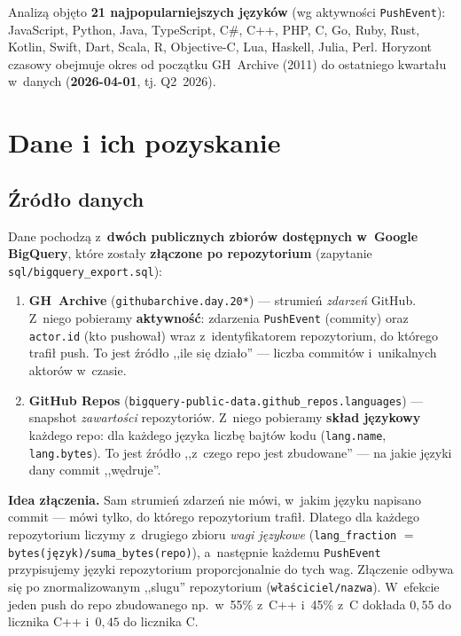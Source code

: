 \documentclass[11pt,a4paper]{article}
\begin{document}
Analizą objęto \textbf{21 najpopularniejszych języków} (wg aktywności \texttt{PushEvent}):
JavaScript, Python, Java, TypeScript, C\#, C++, PHP, C, Go, Ruby, Rust, Kotlin, Swift,
Dart, Scala, R, Objective-C, Lua, Haskell, Julia, Perl. Horyzont czasowy obejmuje okres
od początku GH~Archive (2011) do ostatniego kwartału w~danych (\textbf{2026-04-01}, tj. Q2~2026).

\section{Dane i ich pozyskanie}

\subsection{Źródło danych}

Dane pochodzą z~\textbf{dwóch publicznych zbiorów dostępnych w~Google BigQuery}, które
zostały \textbf{złączone po repozytorium} (zapytanie \texttt{sql/bigquery\_export.sql}):

\begin{enumerate}[leftmargin=1.5em]
  \item \textbf{GH~Archive} (\texttt{githubarchive.day.20*}) --- strumień \emph{zdarzeń}
        GitHub. Z~niego pobieramy \textbf{aktywność}: zdarzenia \texttt{PushEvent} (commity)
        oraz \texttt{actor.id} (kto pushował) wraz z~identyfikatorem repozytorium, do którego
        trafił push. To jest źródło ,,ile się działo'' --- liczba commitów i~unikalnych aktorów
        w~czasie.
  \item \textbf{GitHub Repos} (\texttt{bigquery-public-data.github\_repos.languages}) ---
        snapshot \emph{zawartości} repozytoriów. Z~niego pobieramy \textbf{skład językowy} każdego
        repo: dla każdego języka liczbę bajtów kodu (\texttt{lang.name}, \texttt{lang.bytes}).
        To jest źródło ,,z~czego repo jest zbudowane'' --- na jakie języki dany commit
        ,,wędruje''.
\end{enumerate}

\textbf{Idea złączenia.} Sam strumień zdarzeń nie mówi, w~jakim języku napisano commit ---
mówi tylko, do którego repozytorium trafił. Dlatego dla każdego repozytorium liczymy z~drugiego
zbioru \emph{wagi językowe} (\texttt{lang\_fraction} $=$ \texttt{bytes(język)/suma\_bytes(repo)}),
a~następnie każdemu \texttt{PushEvent} przypisujemy języki repozytorium proporcjonalnie do tych
wag. Złączenie odbywa się po znormalizowanym ,,slugu'' repozytorium (\texttt{właściciel/nazwa}).
W~efekcie jeden push do repo zbudowanego np.\ w~55\% z~C++ i~45\% z~C dokłada $0{,}55$ do licznika
C++ i~$0{,}45$ do licznika C.
\end{document}

